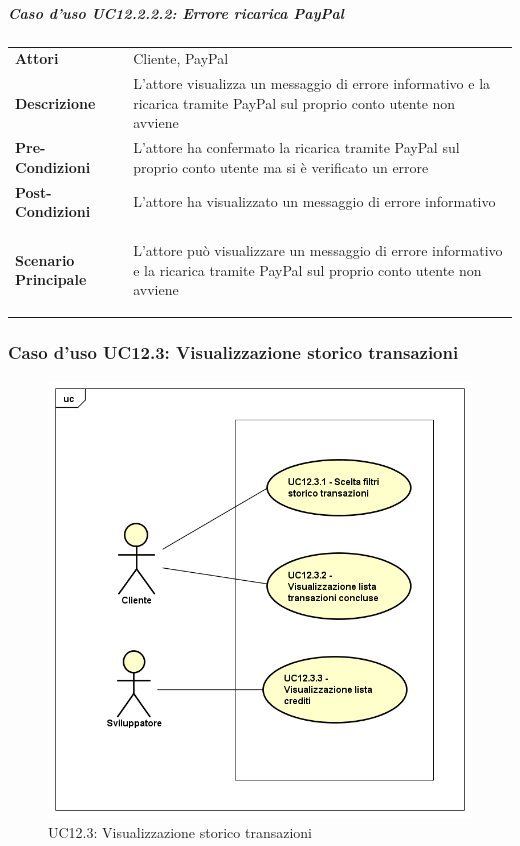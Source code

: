 \subparagraph{Caso d'uso UC12.2.2.2: Errore ricarica PayPal}
\label{UC12_2_2_2}

\begin{minipage}{\linewidth}
	\begin{tabular}{ l | p{11cm}}
		\hline
		\rowcolor{Gray}
		\multicolumn{2}{c}{UC12.2.2.2 - Errore ricarica PayPal} \\
		\hline
		\textbf{Attori} & Cliente, PayPal \\
		\textbf{Descrizione} & L'attore visualizza un messaggio di errore informativo e la ricarica tramite PayPal sul proprio conto utente non avviene \\
		\textbf{Pre-Condizioni} & L'attore ha confermato la ricarica tramite PayPal sul proprio conto utente ma si è verificato un errore \\
		\textbf{Post-Condizioni} & L'attore ha visualizzato un messaggio di errore informativo \\
		\textbf{Scenario Principale} & 
		\begin{enumerate*}[label=(\arabic*.),itemjoin={\newline}]
			\item L'attore può visualizzare un messaggio di errore informativo e la ricarica tramite PayPal sul proprio conto utente non avviene
		\end{enumerate*}\\
	\end{tabular}
\end{minipage}

\newpage
\subsubsection{Caso d'uso UC12.3: Visualizzazione storico transazioni}
\label{UC12_3}
\begin{figure}[ht]
	\centering
	\includegraphics[scale=0.45]{UML/UC12_3.png}
	\caption{UC12.3: Visualizzazione storico transazioni}
\end{figure}

